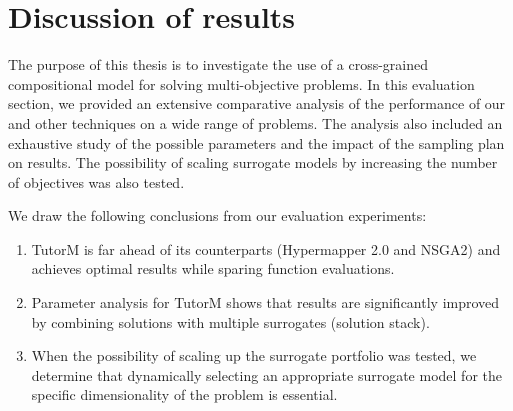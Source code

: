 \section{Discussion of results}

The purpose of this thesis is to investigate the use of a cross-grained compositional model for solving multi-objective problems. In this evaluation section, we provided an extensive comparative analysis of the performance of our and other techniques on a wide range of problems. The analysis also included an exhaustive study of the possible parameters and the impact of the sampling plan on results. The possibility of scaling surrogate models by increasing the number of objectives was also tested.

We draw the following conclusions from our evaluation experiments:
\begin{enumerate}
    \item TutorM is far ahead of its counterparts (Hypermapper 2.0 and NSGA2) and achieves optimal results while sparing function evaluations. 
    \item Parameter analysis for TutorM shows that results are significantly improved by combining solutions with multiple surrogates (solution stack).
    \item When the possibility of scaling up the surrogate portfolio was tested, we determine that dynamically selecting an appropriate surrogate model for the specific dimensionality of the problem is essential.
\end{enumerate}